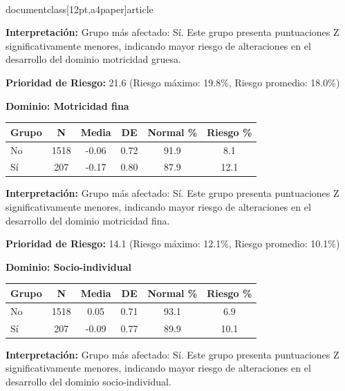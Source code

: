 \\documentclass[12pt,a4paper]{article}
\begin{document}
\textbf{Interpretación:} Grupo más afectado: Sí. Este grupo presenta puntuaciones Z significativamente menores, indicando mayor riesgo de alteraciones en el desarrollo del dominio motricidad gruesa.

\textbf{Prioridad de Riesgo:} 21.6 (Riesgo máximo: 19.8\%, Riesgo promedio: 18.0\%)


\vspace{0.5cm}


\textbf{Dominio: Motricidad fina}


\begin{center}
\begin{tabular}{|l|c|c|c|c|c|}
\hline
\textbf{Grupo} & \textbf{N} & \textbf{Media} & \textbf{DE} & \textbf{Normal \%} & \textbf{Riesgo \%} \\
\hline
No & 1518 & -0.06 & 0.72 & 91.9 & 8.1 \\
Sí & 207 & -0.17 & 0.80 & 87.9 & 12.1 \\

\hline
\end{tabular}
\end{center}


\textbf{Interpretación:} Grupo más afectado: Sí. Este grupo presenta puntuaciones Z significativamente menores, indicando mayor riesgo de alteraciones en el desarrollo del dominio motricidad fina.

\textbf{Prioridad de Riesgo:} 14.1 (Riesgo máximo: 12.1\%, Riesgo promedio: 10.1\%)


\vspace{0.5cm}


\textbf{Dominio: Socio-individual}


\begin{center}
\begin{tabular}{|l|c|c|c|c|c|}
\hline
\textbf{Grupo} & \textbf{N} & \textbf{Media} & \textbf{DE} & \textbf{Normal \%} & \textbf{Riesgo \%} \\
\hline
No & 1518 & 0.05 & 0.71 & 93.1 & 6.9 \\
Sí & 207 & -0.09 & 0.77 & 89.9 & 10.1 \\

\hline
\end{tabular}
\end{center}


\textbf{Interpretación:} Grupo más afectado: Sí. Este grupo presenta puntuaciones Z significativamente menores, indicando mayor riesgo de alteraciones en el desarrollo del dominio socio-individual.
\end{document}
